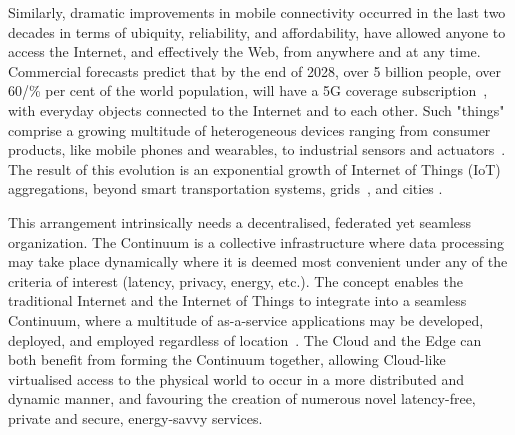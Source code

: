 Similarly, dramatic improvements in mobile connectivity occurred in the last two decades in terms of ubiquity, reliability, and affordability, have allowed anyone to access the Internet, and effectively the Web, from anywhere and at any time.
Commercial forecasts predict that by the end of 2028, over 5 billion people, over $60$/\% per cent of the world population, will have a 5G coverage subscription~\cite{ericsson-5g}, with everyday objects connected to the Internet and to each other. 
Such "things" comprise a growing multitude of heterogeneous devices ranging from consumer products, like mobile phones and wearables, to industrial sensors and actuators~\cite{chen2018edge}. The result of this evolution is an exponential growth of Internet of Things (IoT) aggregations, beyond smart transportation systems, grids~\cite{mugarza2019dynamic}, and cities \cite{cabrini2021enabling}.

This arrangement intrinsically needs a decentralised, federated yet seamless organization. 
The Continuum is a collective infrastructure where data processing may take place dynamically where it is deemed most convenient under any of the criteria of interest (latency, privacy, energy, etc.). The concept enables the traditional Internet and the Internet of Things to integrate into a seamless Continuum, where a multitude of as-a-service applications may be developed, deployed, and employed regardless of location~\cite{beckman2020harnessing}. The Cloud and the Edge can both benefit from forming the Continuum together, allowing Cloud-like virtualised access to the physical world to occur in a more distributed and dynamic manner, and favouring the creation of numerous novel latency-free, private and secure, energy-savvy services.

